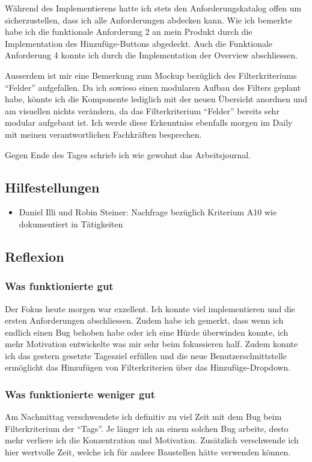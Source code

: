 Während des Implementierens hatte ich stets den Anforderungskatalog offen um sicherzustellen, dass ich alle Anforderungen abdecken kann.
Wie ich bemerkte habe ich die funktionale Anforderung 2 an mein Produkt durch die Implementation des Hinzufüge-Buttons abgedeckt. Auch die Funktionale Anforderung 4 konnte
ich durch die Implementation der Overview abschliessen. 

Ausserdem ist mir eine Bemerkung zum Mockup bezüglich des Filterkriteriums ``Felder'' aufgefallen. Da ich sowieso einen modularen Aufbau des Filters geplant habe, könnte ich die 
Komponente lediglich mit der neuen Übersicht anordnen und am visuellen nichts verändern, da das Filterkriterium ``Felder'' bereits sehr modular aufgebaut ist. Ich werde diese Erkenntniss ebenfalls
morgen im Daily mit meinen verantwortlichen Fachkräften besprechen. 

Gegen Ende des Tages schrieb ich wie gewohnt das Arbeitsjournal.


\subsection*{Hilfestellungen}
\begin{itemize}
    \item Daniel Illi und Robin Steiner: Nachfrage bezüglich Kriterium A10 wie dokumentiert in Tätigkeiten
\end{itemize}

\subsection*{Reflexion}

\subsubsection*{Was funktionierte gut}
Der Fokus heute morgen war exzellent. Ich konnte viel implementieren und die ersten Anforderungen abschliessen. 
Zudem habe ich gemerkt, dass wenn ich endlich einen Bug behoben habe oder ich eine Hürde überwinden konnte, ich mehr Motivation
entwickelte was mir sehr beim fokussieren half. Zudem konnte ich das gestern gesetzte Tagesziel erfüllen und die neue Benutzerschnittstelle ermöglicht das Hinzufügen
von Filterkriterien über das Hinzufüge-Dropdown.

\subsubsection*{Was funktionierte weniger gut}
Am Nachmittag verschwendete ich definitiv zu viel Zeit mit dem Bug beim Filterkriterium der ``Tags''. Je länger ich an einem solchen Bug arbeite, desto mehr
verliere ich die Konzentration und Motivation. Zusätzlich verschwende ich hier wertvolle Zeit, welche ich für andere Baustellen hätte verwenden können.

